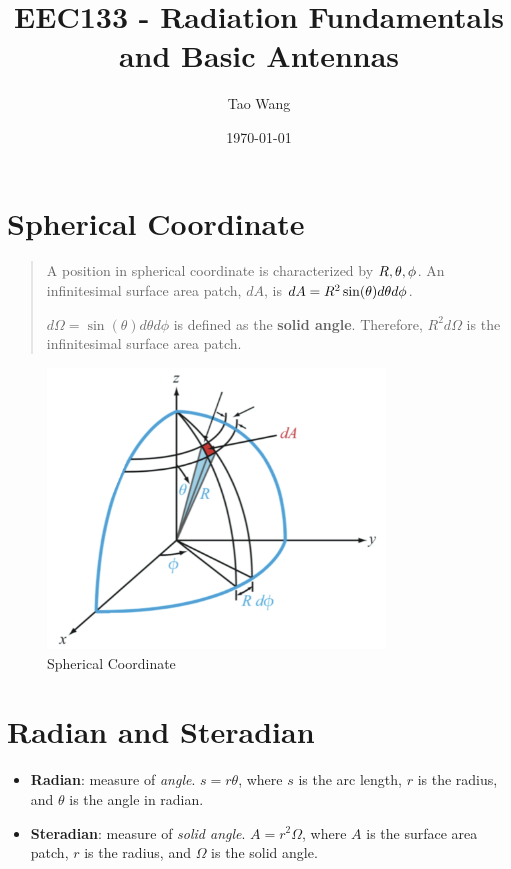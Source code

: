 \documentclass{article} %
\begin{document}
\title{EEC133 - Radiation Fundamentals and Basic Antennas}
\author{Tao Wang}
\date{\today}

\maketitle

\section{Spherical Coordinate}
\begin{quote}
    A position in spherical coordinate is characterized by $R, \space \theta, \space \phi$.
    An infinitesimal surface area patch, $dA$, is $dA = R^2 \sin(\theta) \space d\theta d\phi$.
    \smallskip

    $d\Omega = \sin(\theta) d\theta d\phi$ is defined as the \textbf{solid angle}.
    Therefore, $R^2 d\Omega$ is the infinitesimal surface area patch.
\end{quote}
\begin{figure}[H]
    \centering
    \includegraphics[width=0.8\textwidth]{./image/figure1.png}
    \caption{Spherical Coordinate}
\end{figure}

\section{Radian and Steradian}
\begin{itemize}
    \item \textbf{Radian}: measure of \textit{angle}. $s = r \theta$, where $s$ is the arc length, $r$ is the radius, and $\theta$ is the angle in radian.
    \item \textbf{Steradian}: measure of \textit{solid angle}. $A = r^2 \Omega$, where $A$ is the surface area patch, $r$ is the radius, and $\Omega$ is the solid angle.
\end{itemize}
\end{document}
